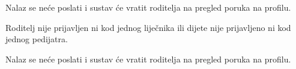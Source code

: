 \begin{packed_item}
\begin{packed_item}
\begin{packed_enum}
								\item Nalaz se neće poslati i sustav će vratit roditelja na pregled poruka na profilu.
							\end{packed_enum}
							
							\item[6.a] Roditelj nije prijavljen ni kod jednog liječnika ili dijete nije prijavljeno ni kod jednog pedijatra.
							\item[] \begin{packed_enum}
								
								\item Nalaz se neće poslati i sustav će vratit roditelja na pregled poruka na profilu.
							\end{packed_enum}
							
							
						\end{packed_item}
					\end{packed_item}
					

